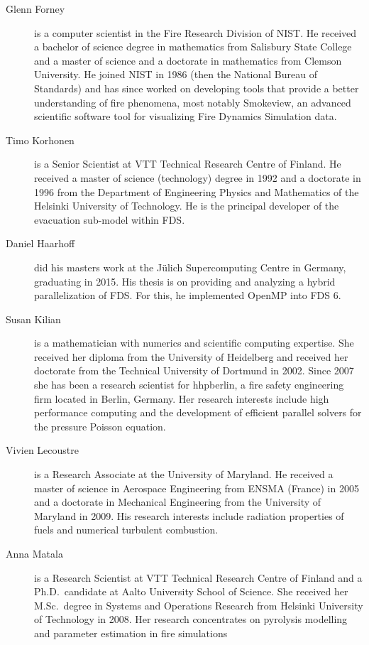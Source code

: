 \begin{description}
\item[Glenn Forney] is a computer scientist in the Fire Research Division of NIST.  He received a bachelor of science degree in mathematics from Salisbury State College and a master of science and a doctorate in mathematics from Clemson University.  He joined NIST in 1986 (then the National Bureau of Standards) and has since worked on developing tools that provide a better understanding of fire phenomena, most notably Smokeview, an advanced scientific software tool for visualizing Fire Dynamics Simulation data.

\item[Timo Korhonen] is a Senior Scientist at VTT Technical Research Centre of Finland. He received a master of science (technology) degree in 1992 and a doctorate in 1996 from the Department of Engineering Physics and Mathematics of the Helsinki University of Technology. He is the principal developer of the evacuation sub-model within FDS.

\item[Daniel Haarhoff] did his masters work at the J\"ulich Supercomputing Centre in Germany, graduating in 2015. His thesis is on providing and analyzing a hybrid parallelization of FDS. For this, he implemented OpenMP into FDS 6.

\item[Susan Kilian] is a mathematician with numerics and scientific computing expertise. She received her diploma from the University of Heidelberg and received her doctorate from the Technical University of Dortmund in 2002. Since 2007 she has been a research scientist for hhpberlin, a fire safety engineering firm located in Berlin, Germany. Her research interests include high performance computing and the development of efficient parallel solvers for the pressure Poisson equation.

\item[Vivien Lecoustre] is a Research Associate at the University of Maryland. He received a master of science in Aerospace Engineering from ENSMA (France) in 2005 and a doctorate in Mechanical Engineering from the University of Maryland in 2009. His research interests include radiation properties of fuels and numerical turbulent combustion.

\item[Anna Matala] is a Research Scientist at VTT Technical Research Centre of Finland and a Ph.D.~candidate at Aalto University School of Science. She received her M.Sc.~degree in Systems and Operations Research from Helsinki University of Technology in 2008. Her research concentrates on pyrolysis modelling and parameter estimation in fire simulations


\end{description}
